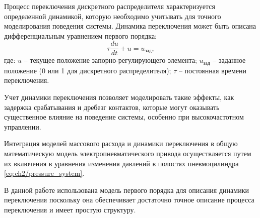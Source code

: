 Процесс переключения дискретного распределителя характеризуется
определенной динамикой, которую необходимо учитывать для точного моделирования поведения
системы. Динамика переключения может быть описана дифференциальным уравнением первого порядка:
\begin{equation}
\label{eq:ch2/switching_dynamics}
    \tau \frac{du}{dt} + u = u_{зад},
\end{equation}
где:
$u$ -- текущее положение запорно-регулирующего элемента;
$u_{зад}$ -- заданное положение (0 или 1 для дискретного распределителя);
$\tau$ -- постоянная времени переключения.

Учет динамики переключения позволяет моделировать такие эффекты, как задержка
срабатывания и дребезг контактов, которые могут оказывать
существенное влияние на поведение системы,
особенно при высокочастотном управлении.

Интеграция моделей массового расхода и динамики переключения
в общую математическую модель электропневматического привода
осуществляется путем их включения в уравнения
изменения давлений в полостях пневмоцилиндра \ref{eq:ch2/pressure_system}.

В данной работе использована модель первого порядка для описания динамики переключения
поскольку она обеспечивает достаточно точное описание процесса переключения
и имеет простую структуру.

